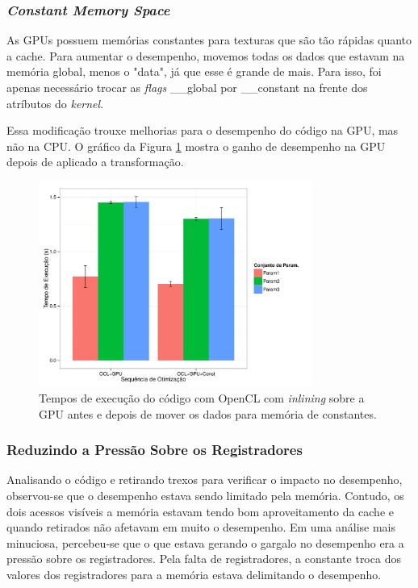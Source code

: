 \documentclass[12pt]{article}
\begin{document}
\subsubsection{\textit{Constant Memory Space}}

As GPUs possuem memórias constantes para texturas que são tão rápidas quanto a cache. Para aumentar o desempenho, movemos todas os dados que estavam na memória global, menos o "data", já que esse é grande de mais. Para isso, foi apenas necessário trocar as \textit{flags} \_\_global por \_\_constant na frente dos atríbutos do \textit{kernel}.

Essa modificação trouxe melhorias para o desempenho do código na GPU, mas não na CPU. O gráfico da Figura \ref{fgclconst} mostra o ganho de desempenho na GPU depois de aplicado a transformação.

\begin{figure}[H]
\centering
\includegraphics[width=0.8\textwidth]{oclconst.pdf}
\caption{Tempos de execução do código com OpenCL com \textit{inlining} sobre a GPU antes e depois de mover os dados para memória de constantes.}
\label{fgclconst}
\end{figure}

\subsubsection{Reduzindo a Pressão Sobre os Registradores }

Analisando o código e retirando trexos para verificar o impacto no desempenho, observou-se que o desempenho estava sendo limitado pela memória. Contudo, os dois acessos visíveis a memória estavam tendo bom aproveitamento da cache e quando retirados não afetavam em muito o desempenho. Em uma análise mais minuciosa, percebeu-se que o que estava gerando o gargalo no desempenho era a pressão sobre os registradores. Pela falta de registradores, a constante troca dos valores dos registradores para a memória estava delimitando o desempenho. 
\end{document}
